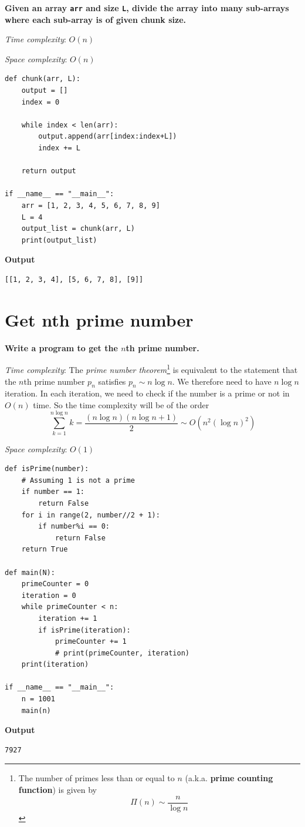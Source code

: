 \documentclass[a4paper,11pt]{book}
\begin{document}
\textbf{Given an array \lstinline{arr} and size \lstinline{L}, divide the array into many sub-arrays where each sub-array is of given chunk size. }
\vspace{5mm}

\noindent \textit{Time complexity}:  $O(n)$

\noindent \textit{Space complexity}: $O(n)$

\begin{lstlisting}
def chunk(arr, L):
    output = []
    index = 0

    while index < len(arr):
        output.append(arr[index:index+L])
        index += L
    
    return output

if __name__ == "__main__":
    arr = [1, 2, 3, 4, 5, 6, 7, 8, 9]
    L = 4
    output_list = chunk(arr, L)
    print(output_list)
\end{lstlisting}
\textbf{Output}
\begin{lstlisting}
[[1, 2, 3, 4], [5, 6, 7, 8], [9]]
\end{lstlisting}

\newpage
\section{Get nth prime number}

\textbf{Write a program to get the $n$th prime number.}
\vspace{5mm}

\noindent \textit{Time complexity}: The \textit{prime number theorem}\footnote{The number of primes less than or equal to $n$ (a.k.a. \textbf{prime counting function}) is given by $$\Pi(n) \sim \dfrac{n}{\log n}$$} is equivalent to the statement that the $n$th prime number $p_n$ satisfies $p_n \sim n\log n$.  We therefore need to have $n\log n$ iteration. In each iteration, we need to check if the number is a prime or not in $O(n)$ time. So the time complexity will be of the order
$$\sum_{k=1}^{n\log n} k = \dfrac{(n\log n)(n\log n + 1)}{2} \sim O(n^2(\log n)^2)$$

\noindent \textit{Space complexity}: $O(1)$

\begin{lstlisting}
def isPrime(number):
    # Assuming 1 is not a prime
    if number == 1:
        return False
    for i in range(2, number//2 + 1):
        if number%i == 0:
            return False
    return True

def main(N):
    primeCounter = 0
    iteration = 0
    while primeCounter < n:
        iteration += 1
        if isPrime(iteration):
            primeCounter += 1
            # print(primeCounter, iteration)
    print(iteration)

if __name__ == "__main__":
    n = 1001
    main(n)
\end{lstlisting}
\textbf{Output}
\begin{lstlisting}
7927
\end{lstlisting}
\end{document}
